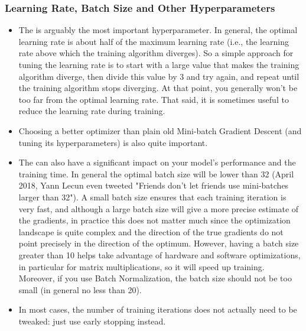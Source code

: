 \subsubsection{Learning Rate, Batch Size and Other Hyperparameters}
\begin{itemize}
\item The  is arguably the most important hyperparameter. In general, the optimal learning rate is about half of the maximum learning rate (i.e., the learning rate above which the training algorithm diverges). So a simple approach for tuning the learning rate is to start with a large value that makes the training algorithm diverge, then divide this value by $3$ and try again, and repeat until the training algorithm stops diverging. At that point, you generally won't be too far from the optimal learning rate. That said, it is sometimes useful to reduce the learning rate during training.

\item Choosing a better optimizer than plain old Mini-batch Gradient Descent (and tuning its hyperparameters) is also quite important.
\item The  can also have a significant impact on your model's performance and the training time. In general the optimal batch size will be lower than 32 (April 2018, Yann Lecun even tweeted "Friends don't let friends use mini-batches larger than 32"). A small batch size ensures that each training iteration is very fast, and although a large batch size will give a more precise estimate of the gradients, in practice this does not matter much since the optimization landscape is quite complex and the direction of the true gradients do not point precisely in the direction of the optimum. However, having a batch size greater than 10 helps take advantage of hardware and software optimizations, in particular for matrix multiplications, so it will speed up training. Moreover, if you use Batch Normalization, the batch size should not be too small (in general no less than 20).
\item In most cases, the number of training iterations does not actually need to be tweaked: just use early stopping instead.
\end{itemize}